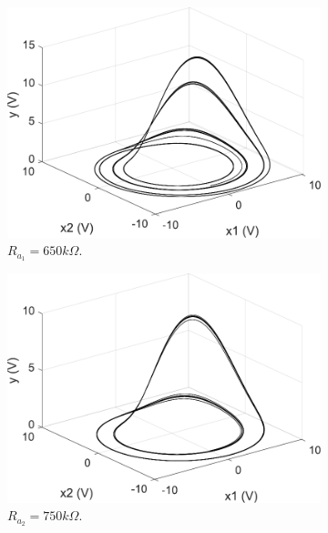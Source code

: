     \begin{figure}
        \centering
        \begin{subfigure}[b]{0.22\textwidth}
            \centering
            \includegraphics[scale=0.28]{figs/paraA/3dParaA650.pdf}
            \caption{$R_{a_1} = 650k\Omega$.}    
        \end{subfigure}
        \begin{subfigure}[b]{0.22\textwidth}  
            \centering 
            \includegraphics[scale=0.28]{figs/paraA/3dParaA750.pdf}
            \caption{$R_{a_2} = 750k\Omega$.}  
        \end{subfigure}
        \begin{subfigure}[b]{0.22\textwidth}   
            \centering 

\end{subfigure}
\end{figure}
